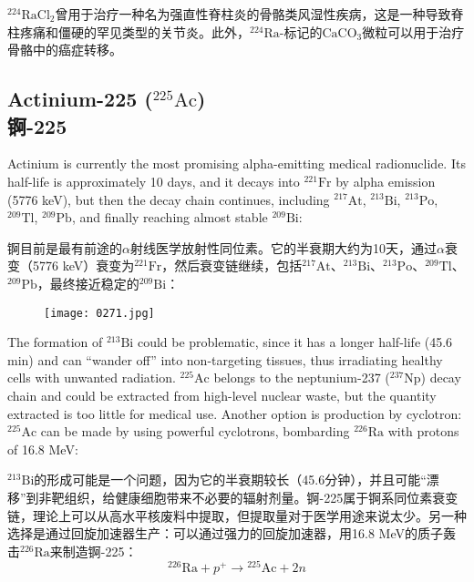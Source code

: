 \documentclass[dvipsnames, svgnames,a4paper,11pt]{article}
\begin{document}
\(\mathrm{^{224}RaCl_2}\)曾用于治疗一种名为强直性脊柱炎的骨骼类风湿性疾病，这是一种导致脊柱疼痛和僵硬的罕见类型的关节炎。此外，\(\mathrm{^{224}Ra}\)-标记的\(\mathrm{CaCO_3}\)微粒可以用于治疗骨骼中的癌症转移。

\subsection{Actinium-225 (\(\mathrm{^{225}Ac}\)) \\锕-225}  
Actinium is currently the most promising alpha-emitting medical radionuclide. Its half-life is approximately 10 days, and it decays into \(\mathrm{^{221}Fr}\) by alpha emission (5776 keV), but then the decay chain continues, including \(\mathrm{^{217}At}\), \(\mathrm{^{213}Bi}\), \(\mathrm{^{213}Po}\), \(\mathrm{^{209}Tl}\), \(\mathrm{^{209}Pb}\), and finally reaching almost stable \(\mathrm{^{209}Bi}\):  

锕目前是最有前途的$\alpha$射线医学放射性同位素。它的半衰期大约为10天，通过$\alpha$衰变（5776 keV）衰变为\(\mathrm{^{221}Fr}\)，然后衰变链继续，包括\(\mathrm{^{217}At}\)、\(\mathrm{^{213}Bi}\)、\(\mathrm{^{213}Po}\)、\(\mathrm{^{209}Tl}\)、\(\mathrm{^{209}Pb}\)，最终接近稳定的\(\mathrm{^{209}Bi}\)：  

\begin{figure}[h]
	\centering
    \texttt{[image: 0271.jpg]}  
     \label{fig366}
\end{figure}


The formation of \(\mathrm{^{213}Bi}\) could be problematic, since it has a longer half-life (45.6 min) and can “wander off” into non-targeting tissues, thus irradiating healthy cells with unwanted radiation. \(\mathrm{^{225}Ac}\) belongs to the neptunium-237 (\(\mathrm{^{237}Np}\)) decay chain and could be extracted from high-level nuclear waste, but the quantity extracted is too little for medical use. Another option is production by cyclotron: \(\mathrm{^{225}Ac}\) can be made by using powerful cyclotrons, bombarding \(\mathrm{^{226}Ra}\) with protons of 16.8 MeV:

\(\mathrm{^{213}Bi}\)的形成可能是一个问题，因为它的半衰期较长（45.6分钟），并且可能“漂移”到非靶组织，给健康细胞带来不必要的辐射剂量。锕-225属于锕系同位素衰变链，理论上可以从高水平核废料中提取，但提取量对于医学用途来说太少。另一种选择是通过回旋加速器生产：可以通过强力的回旋加速器，用16.8 MeV的质子轰击\(\mathrm{^{226}Ra}\)来制造锕-225：
\[
\mathrm{^{226}Ra} + p^+ \rightarrow \mathrm{^{225}Ac} + 2n
\]
\end{document}
